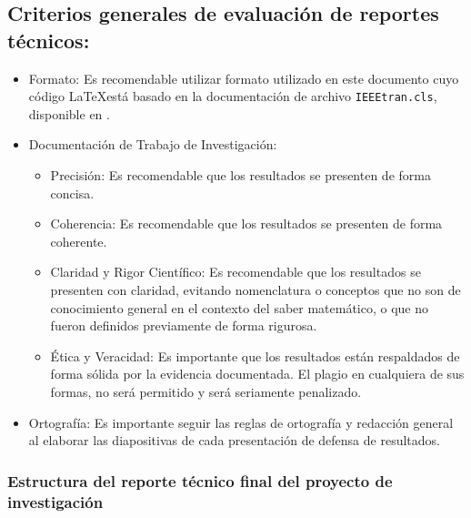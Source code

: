 \documentclass[peerreview]{IEEEtran}
\begin{document}
\subsection{Criterios generales de evaluaci\'on de reportes t\'ecnicos:}

\begin{itemize}
\item Formato: Es recomendable utilizar formato utilizado en este documento cuyo c\'odigo \LaTeX est\'a basado en la documentaci\'on de archivo {\tt IEEEtran.cls}, disponible en \cite{IEEETran}.

\item Documentaci\'on de Trabajo de Investigaci\'on:

\begin{itemize}
\item Precisi\'on: Es recomendable que los resultados se presenten de forma concisa.

\item Coherencia: Es recomendable que los resultados se presenten de forma coherente.

\item Claridad y Rigor Cient\'ifico: Es recomendable que los resultados se presenten con claridad, evitando nomenclatura o conceptos que no son de conocimiento general en el contexto del saber matem\'atico, o que no fueron definidos previamente de forma rigurosa.

\item \'Etica y Veracidad: Es importante que los resultados est\'an respaldados de forma s\'olida por la evidencia documentada. El plagio en cualquiera de sus formas, no ser\'a permitido y ser\'a seriamente penalizado.
\end{itemize}


\item Ortograf\'ia: Es importante seguir las reglas de ortograf\'ia y redacci\'on general al elaborar las diapositivas de cada presentaci\'on de defensa de resultados.

\end{itemize}

\subsubsection{Estructura del reporte t\'ecnico final del proyecto de investigaci\'on}
\end{document}
